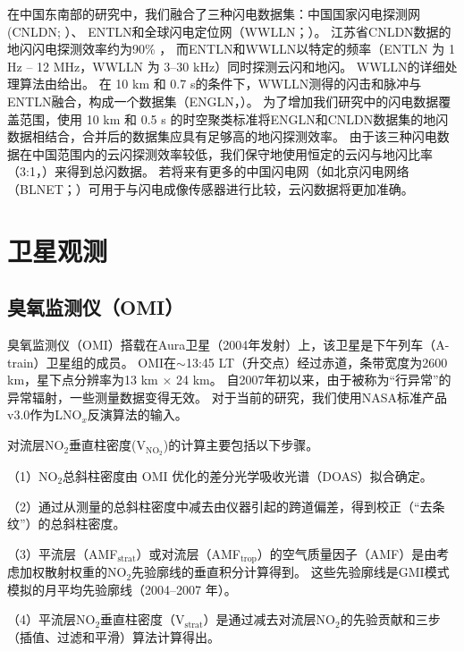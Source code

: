 在中国东南部的研究中，我们融合了三种闪电数据集：中国国家闪电探测网(CNLDN; \citet{Yang.2015}）、
ENTLN和全球闪电定位网（WWLLN；\citet{Rodger.2006}）。
江苏省CNLDN数据的地闪闪电探测效率约为90\% \citep{Li.2017a}，
而ENTLN和WWLLN以特定的频率（ENTLN 为 1 Hz -- 12 MHz，WWLLN 为 3--30 kHz）同时探测云闪和地闪。
WWLLN的详细处理算法由\citet{Rodger.2004}给出。
在 10 km 和 0.7 s的条件下，WWLLN测得的闪击和脉冲与ENTLN融合，构成一个数据集（ENGLN，\citet{Virts.2020b}）。
为了增加我们研究中的闪电数据覆盖范围，使用 10 km 和 0.5 s 的时空聚类标准将ENGLN和CNLDN数据集的地闪数据相结合\citep{Zhao.2020}，合并后的数据集应具有足够高的地闪探测效率。
由于该三种闪电数据在中国范围内的云闪探测效率较低，我们保守地使用恒定的云闪与地闪比率（3:1，\citet{Wu.2016,Bandholnopparat.2020}）来得到总闪数据。
若将来有更多的中国闪电网（如北京闪电网络（BLNET；\citet{Srivastava.2017}）可用于与闪电成像传感器进行比较\citep{Rudlosky.2013,Poelman.2020}，云闪数据将更加准确。

\section{卫星观测}

\subsection{臭氧监测仪（OMI）}

臭氧监测仪（OMI）搭载在Aura卫星（2004年发射）上，该卫星是下午列车（A-train）卫星组的成员\citep{Levelt.2006,Levelt.2018}。
OMI在$\sim$13:45 LT（升交点）经过赤道，条带宽度为2600 km，星下点分辨率为13 km $\times$ 24 km。
自2007年初以来，由于被称为“行异常”的异常辐射\citep{Dobber.2008}，一些测量数据变得无效。
对于当前的研究，我们使用NASA标准产品v3.0\citep{Krotkov.2017}作为LNO$_x$反演算法的输入。

对流层NO$_2$垂直柱密度(V$_{\textrm{NO$_2$}}$)的计算主要包括以下步骤。

（1）NO$_2$总斜柱密度由 OMI 优化的差分光学吸收光谱（DOAS）拟合确定。

（2）通过从测量的总斜柱密度中减去由仪器引起的跨道偏差，得到校正（“去条纹”）的总斜柱密度。

（3）平流层（AMF$_{\textrm{strat}}$）或对流层（AMF$_{\textrm{trop}}$）的空气质量因子（AMF）是由考虑加权散射权重的NO$_2$先验廓线的垂直积分计算得到。
这些先验廓线是GMI模式模拟的月平均先验廓线（2004--2007 年）。

（4）平流层NO$_2$垂直柱密度（V$_{\textrm{strat}}$）是通过减去对流层NO$_2$的先验贡献和三步（插值、过滤和平滑）算法计算得出\citep{Bucsela.2013}。

